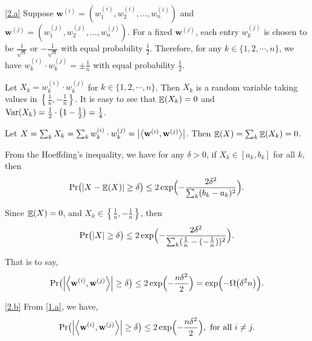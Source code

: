 \documentclass{homework}
\begin{document}
\begin{solution}

  \ref{2.a}
  Suppose $\mathbf{w}^{(i)} = (w_1^{(i)}, w_2^{(i)}, \ldots, w_n^{(i)})$
  and $\mathbf{w}^{(j)} = (w_1^{(j)}, w_2^{(j)}, \ldots, w_n^{(j)})$.
  For a fixed $\mathbf{w}^{(j)}$, each entry $w_k^{(j)}$ is chosen
  to be $\frac{1}{\sqrt{n}}$ or $-\frac{1}{\sqrt{n}}$ with equal probability $\frac{1}{2}$.
  Therefore, for any $k \in \{1, 2, \cdots, n\}$, we have $w_k^{(i)} \cdot w_k^{(j)} = \pm \frac{1}{n}$
  with equal probability $\frac{1}{2}$.

  Let $X_k = w_k^{(i)} \cdot w_k^{(j)}$ for $k \in \{1, 2, \cdots, n\}$.
  Then $X_k$ is a random variable taking values in $\left\{ \frac{1}{n}, -\frac{1}{n} \right\}$.
  It is easy to see that $\mathop{\mathbb{E}}\displaylimits(X_k) = 0$ and $\mathop{\mathrm{Var}}\displaylimits(X_k) = \frac{1}{2}\cdot \bigl(1 - \frac{1}{2}\bigr) = \frac{1}{4}$.

  Let $X = \sum_{k} X_k = \sum_{k} w_k^{(i)} \cdot w_k^{(j)} = \left\lvert \left\langle\mathbf{w}^{(i)},\mathbf{w}^{(j)}\right\rangle \right\rvert$.
  Then $\mathop{\mathbb{E}}\displaylimits(X) = \sum_{k} \mathop{\mathbb{E}}\displaylimits(X_k) = 0$.

  From the Hoeffding's inequality, we have for any $\delta > 0$, if $X_k \in [a_k, b_k]$
  for all $k$, then
  \begin{equation*}
    \Pr \bigl( \left\lvert X - \mathop{\mathbb{E}}\displaylimits(X) \right\rvert \ge \delta \bigr)
    \le 2 \exp \Bigl( - \frac{2\delta^2}{\sum_{k} (b_k - a_k)^2} \Bigr).
  \end{equation*}

  Since $\mathop{\mathbb{E}}\displaylimits(X) = 0$, and $X_k \in \left\{ \frac{1}{n}, -\frac{1}{n} \right\}$, then
  \begin{equation*}
    \Pr \bigl( \left\lvert X \right\rvert \ge \delta \bigr) \le
    2 \exp \Bigl( - \frac{2\delta^2}{\sum_{k} (\frac{1}{n} - (-\frac{1}{n}))^2} \Bigr).
  \end{equation*}

  That is to say,
  \begin{equation*}
    \Pr \bigl( \left\lvert \left\langle\mathbf{w}^{(i)},\mathbf{w}^{(j)}\right\rangle \right\rvert \ge \delta \bigr)
    \le 2 \exp \Bigl( - \frac{n\delta^2}{2} \Bigr)
    = \exp \Bigl( - \Omega \bigl( \delta^{2} n \bigr) \Bigr).
  \end{equation*}

  \ref{2.b}
  From \ref{1.a}, we have,
  \begin{equation*}
    \Pr \bigl( \left\lvert \left\langle\mathbf{w}^{(i)},\mathbf{w}^{(j)}\right\rangle \right\rvert \ge \delta \bigr)
    \le 2 \exp \Bigl( - \frac{n\delta^2}{2} \Bigr), \text{ for all } i \ne j.
  \end{equation*}


\end{solution}
\end{document}

